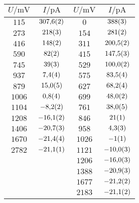 \begin{figure}[htbp]
{\begin{tabular}{cc||cc}
\hline
$U / \unit{\milli\volt}$ & $I / \unit{\pico\ampere}$ & $U / \unit{\milli\volt}$ & $I / \unit{\pico\ampere}$ \\ 
\hline
$\num{115}$ & $\num{307.6\pm 0.2}$ & $\num{0}$ & $\num{388\pm 3}$ \\
$\num{273}$ & $\num{218\pm 3}$ & $\num{154}$ & $\num{281\pm 2}$ \\
$\num{416}$ & $\num{148\pm 2}$ & $\num{311}$ & $\num{200.5\pm 0.2}$ \\
$\num{590}$ & $\num{82\pm 2}$ & $\num{415}$ & $\num{147.5\pm 0.3}$ \\
$\num{745}$ & $\num{39\pm 3}$ & $\num{529}$ & $\num{100.0\pm 0.2}$ \\
$\num{937}$ & $\num{7.4\pm 0.4}$ & $\num{575}$ & $\num{83.5\pm 0.4}$ \\
$\num{879}$ & $\num{15.0\pm 0.5}$ & $\num{627}$ & $\num{68.2\pm 0.4}$ \\
$\num{1006}$ & $\num{0.8\pm 0.4}$ & $\num{699}$ & $\num{48.0\pm 0.2}$ \\
$\num{1104}$ & $\num{-8.2\pm 0.2}$ & $\num{761}$ & $\num{38.0\pm 0.5}$ \\
$\num{1208}$ & $\num{-16.1\pm 0.2}$ & $\num{846}$ & $\num{21\pm 1}$ \\
$\num{1406}$ & $\num{-20.7\pm 0.3}$ & $\num{958}$ & $\num{4.3\pm 0.3}$ \\
$\num{1670}$ & $\num{-21.4\pm 0.4}$ & $\num{1026}$ & $\num{-1\pm 1}$ \\
$\num{2782}$ & $\num{-21.1\pm 0.1}$ & $\num{1121}$ & $\num{-10.0\pm 0.3}$ \\
   &    & $\num{1206}$ & $\num{-16.0\pm 0.3}$ \\
   &    & $\num{1388}$ & $\num{-20.9\pm 0.3}$ \\
   &    & $\num{1677}$ & $\num{-21.2\pm 0.2}$ \\
   &    & $\num{2183}$ & $\num{-21.1\pm 0.2}$ \\
\hline\end{tabular}
\label{kennlinie_405nm}
}\end{figure}